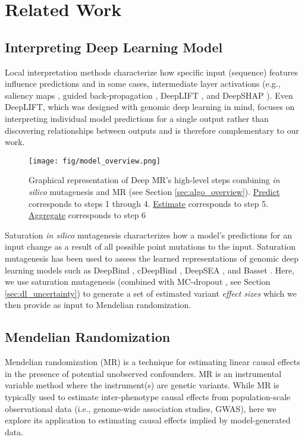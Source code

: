 \documentclass{article}
\begin{document}
\section{Related Work}
\subsection{Interpreting Deep Learning Model}
Local interpretation methods characterize how specific input (sequence) features influence predictions and in some cases, intermediate layer activations (e.g., saliency maps \cite{simonyan2013deep}, guided back-propagation \cite{springenberg2014striving}, DeepLIFT \cite{shrikumar2017learning}, and DeepSHAP \cite{lundberg2017unified}). Even DeepLIFT, which was designed with genomic deep learning in mind, focuses on interpreting individual model predictions for a single output rather than discovering relationships between outputs and is therefore complementary to our work.
\begin{figure*}[htpb]
    \centering
    \texttt{[image: fig/model\_overview.png]}
    \vspace{-12pt}
    \caption{Graphical representation of Deep MR's high-level steps combining \textit{in silico} mutagenesis and MR (see Section \ref{sec:algo_overview}). \underline{Predict} corresponds to steps 1 through 4. \underline{Estimate} corresponds to step 5. \underline{Aggregate} corresponds to step 6}
    \vspace{-10pt}
    \label{fig:model_overview}
\end{figure*}

Saturation \emph{in silico} mutagenesis characterizes how a model's predictions for an input change as a result of all possible point mutations to the input. Saturation mutagenesis has been used to assess the learned representations of genomic deep learning models such as DeepBind \cite{alipanahi2015predicting}, cDeepBind \cite{gandhi2018cdeepbind}, DeepSEA \cite{zhou2015predicting}, and Basset \cite{kelley2016basset}. Here, we use saturation mutagenesis (combined with MC-dropout \cite{gal2016dropout}, see Section \ref{sec:dl_uncertainty}) to generate a set of estimated variant \textit{effect sizes} which we then provide as input to Mendelian randomization.

\subsection{Mendelian Randomization}

Mendelian randomization (MR) is a technique for estimating linear causal effects in the presence of potential unobserved confounders. MR is an instrumental variable method where the instrument(s) are genetic variants. While MR is typically used to estimate inter-phenotype causal effects from population-scale observational data (i.e., genome-wide association studies, GWAS), here we explore its application to estimating causal effects implied by model-generated data.
\end{document}
